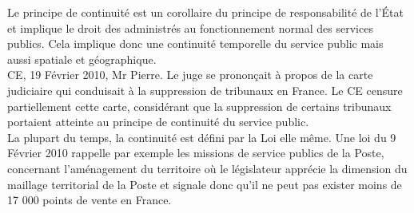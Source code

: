 \documentclass[10pt, a4paper, openany]{book}
\begin{document}
Le principe de continuité est un corollaire du principe de responsabilité de l'État et implique le droit des administrés au fonctionnement normal des services publics. Cela implique donc une continuité temporelle du service public mais aussi spatiale et géographique. \\
CE, 19 Février 2010, Mr Pierre. Le juge se prononçait à propos de la carte judiciaire qui conduisait à la suppression de tribunaux en France. Le CE censure partiellement cette carte, considérant que la suppression de certains tribunaux portaient atteinte au principe de continuité du service public. \\
La plupart du temps, la continuité est défini par la Loi elle même. Une loi du 9 Février 2010 rappelle par exemple les missions de service publics de la Poste, concernant l'aménagement du territoire où le législateur apprécie la dimension du maillage territorial de la Poste et signale donc qu'il ne peut pas exister moins de 17 000 points de vente en France. 
\end{document}
